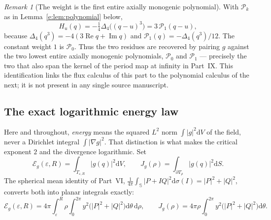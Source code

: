 \documentclass[11pt,a4paper]{article}
\numberwithin{equation}{section}
\theoremstyle{definition}
\theoremstyle{remark}
\newtheorem{remark}[theorem]{Remark}
\theoremstyle{plain}
\newcommand{\SSS}{\mathbb S}
\DeclareMathOperator{\Rea}{Re}
\DeclareMathOperator{\Ima}{Im}
\newcommand{\lap}{\Delta_4}
\newcommand{\Eg}{\mathcal E_{g}}
\newcommand{\Jg}{J_{g}}
\newcommand{\Tube}{T}
\newcommand{\abs}[1]{\lvert #1\rvert}
\newcommand{\dd}{\mathrm d}
\begin{document}
\begin{remark}[The weight is the first entire axially monogenic
polynomial]
\label{e:rem:Huispoly}
With $\mathcal P_k$ as in Lemma~\ref{e:lem:polynomial} below,
\begin{equation}
 H_u(q)=-\tfrac14\lap\bigl((q-u)^3\bigr)=3\,\mathcal P_1(q-u),
 \label{e:eq:Hu-poly}
\end{equation}
because $\lap(q^3)=-4(3\Rea q+\Ima q)$ and
$\mathcal P_1(q)=-\lap(q^3)/12$. The constant weight $1$ is
$\mathcal P_0$. Thus the two residues are recovered by pairing $g$
against the two lowest entire axially monogenic polynomials, $\mathcal
P_0$ and $\mathcal P_1$ --- precisely the two that also span the kernel
of the period map at infinity in Part~IX. This identification links the
flux calculus of this part to the polynomial calculus of the next; it is
not present in any single source manuscript.
\end{remark}

\subsection{The exact logarithmic energy law}
\label{e:sec:energylaw}

Here and throughout, \emph{energy} means the squared $L^2$ norm
$\int\abs g^2\dd V$ of the field, never a Dirichlet integral
$\int\abs{\nabla g}^2$. That distinction is what makes the critical
exponent $2$ and the divergence logarithmic. Set
\begin{equation}
 \Eg(\varepsilon,R)=\int_{\Tube_{\varepsilon,R}}\abs{g(q)}^2\dd V,
 \qquad
 \Jg(\rho)=\int_{\partial\Tube_\rho}\abs{g(q)}^2\dd S .
 \label{e:eq:energydef}
\end{equation}
The spherical mean identity of Part~VI,
$\tfrac1{4\pi}\int_{\SSS}\abs{P+IQ}^2\dd\sigma(I)=\abs P^2+\abs Q^2$,
converts both into planar integrals exactly:
\begin{equation}
 \Eg(\varepsilon,R)
 =4\pi\int_\varepsilon^R\!\!\rho\int_0^{2\pi}
    y^2\bigl(\abs P^2+\abs Q^2\bigr)\dd\theta\,\dd\rho,
 \qquad
 \Jg(\rho)=4\pi\rho\int_0^{2\pi}y^2\bigl(\abs P^2+\abs Q^2\bigr)\dd\theta .
 \label{e:eq:energyreduction}
\end{equation}
\end{document}
